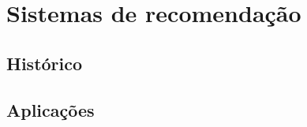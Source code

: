 \chapter{Sistemas de recomendação}
\label{cap:sistemas_de_recomendacao}

\section{Histórico}


\section{Aplicações}